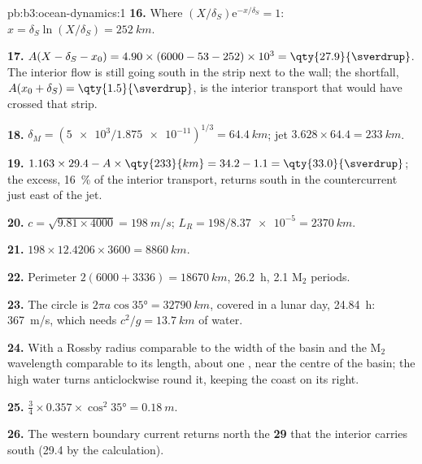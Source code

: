 \begin{solution}{pb:b3:ocean-dynamics:1}
\textbf{16.} Where $(X/\delta_S)\mathrm e^{-x/\delta_S} = 1$: $x =
\delta_S\ln(X/\delta_S) = \qty{252}{km}$.

\textbf{17.} $A(X - \delta_S - x_0) = 4.90\times(6000 - 53 - 252)\times
10^3 = \qty{27.9}{\sverdrup}$. The interior flow is still going south in
the strip next to the wall; the shortfall, $A(x_0 + \delta_S) =
\qty{1.5}{\sverdrup}$, is the interior transport that would have crossed
that strip.

\textbf{18.} $\delta_M = (\num{5e3}/\num{1.875e-11})^{1/3} = \qty{64.4}{km}$;
jet $3.628\times64.4 = \qty{233}{km}$.

\textbf{19.} $1.163\times29.4 - A\times\qty{233}{km} = 34.2 - 1.1 =
\qty{33.0}{\sverdrup}$; the excess, \qty{16}{\percent} of the interior
transport, returns south in the countercurrent just east of the jet.

\textbf{20.} $c = \sqrt{9.81\times4000} = \qty{198}{m/s}$; $L_R =
198/\num{8.37e-5} = \qty{2370}{km}$.

\textbf{21.} $198\times12.4206\times3600 = \qty{8860}{km}$.

\textbf{22.} Perimeter $2(6000 + 3336) = \qty{18670}{km}$, \qty{26.2}{h},
2.1 M$_2$ periods.

\textbf{23.} The circle is $2\pi a\cos\ang{35} = \qty{32790}{km}$, covered
in a lunar day, \qty{24.84}{h}: \qty{367}{m/s}, which needs $c^2/g =
\qty{13.7}{km}$ of water.

\textbf{24.} With a Rossby radius comparable to the width of the basin
and the M$_2$ wavelength comparable to its length, about one , near the centre of the basin; the high water turns anticlockwise
round it, keeping the coast on its right.

\textbf{25.} $\tfrac34\times0.357\times\cos^2\ang{35} = \qty{0.18}{m}$.

\textbf{26.} The western boundary current returns north the
\textbf{\qty[text-series-to-math=true]{29}{\sverdrup}} that the interior
carries south (\qty{29.4}{\sverdrup} by the calculation).
\end{solution}
